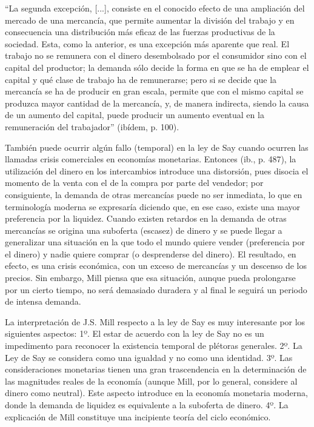 \documentclass[10pt,a4paper]{article}
\begin{document}
“La segunda excepción, [...], consiste en el conocido efecto de una ampliación del mercado de una mercancía, que permite aumentar la división del trabajo y en consecuencia una distribución más eficaz de las fuerzas productivas de la sociedad. Esta, como la anterior, es una excepción más aparente que real. El trabajo no se remunera con el dinero desembolsado por el consumidor sino con el capital del productor; la demanda sólo decide la forma en que se ha de emplear el capital y qué clase de trabajo ha de remunerarse; pero si se decide que la mercancía se ha de producir en gran escala, permite que con el mismo capital se produzca mayor cantidad de la mercancía, y, de manera indirecta, siendo la causa de un aumento del capital, puede producir un aumento eventual en la remuneración del trabajador” (ibídem, p. 100). 

También puede ocurrir algún fallo (temporal) en la ley de Say cuando ocurren las llamadas crisis comerciales en economías monetarias. Entonces (ib., p. 487), la utilización del dinero en los intercambios introduce una distorsión, pues disocia el momento de la venta con el de la compra por parte del vendedor; por consiguiente, la demanda de otras mercancías puede no ser inmediata, lo que en terminología moderna se expresaría diciendo que, en ese caso, existe una mayor preferencia por la liquidez. Cuando existen retardos en la demanda de otras mercancías se origina una suboferta (escasez) de dinero y se puede llegar a generalizar una  situación en la que todo el mundo quiere vender (preferencia por el dinero) y nadie quiere comprar (o desprenderse del dinero). El resultado, en efecto, es una crisis económica, con un exceso de mercancías y un descenso de los precios. Sin embargo, Mill piensa que esa situación, aunque pueda prolongarse por un cierto tiempo, no será demasiado duradera y al final le seguirá un periodo de intensa demanda. 

La interpretación de J.S. Mill respecto a la ley de Say es muy interesante por los siguientes aspectos: 
1º. El estar de acuerdo con la ley de Say no es un impedimento para reconocer la existencia temporal de plétoras generales. 
2º. La Ley de Say se considera como una igualdad y no como una identidad. 
3º. Las consideraciones monetarias tienen una gran trascendencia en la determinación de las magnitudes reales de la economía (aunque Mill, por lo general, considere al dinero como neutral). Este aspecto introduce en la economía monetaria moderna, donde la demanda de liquidez es equivalente a la suboferta de dinero. 
4º. La explicación de Mill constituye una incipiente teoría del ciclo económico.
\end{document}
